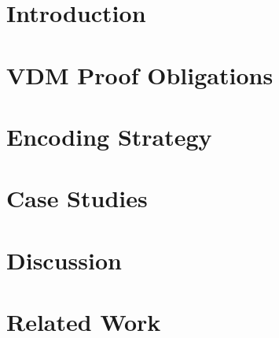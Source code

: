 \documentclass[sigconf]{acmart}
\begin{document}


\maketitle

% 
\section{Introduction}
\label{section:introduction}




% 

\section{VDM Proof Obligations}

% 

\label{section:proof-obligations}



\section{Encoding Strategy}
\label{section:encode-strategy}



\section{Case Studies}
\label{section:case-studies}



\section{Discussion}
\label{section:discussion}



\section{Related Work}
\label{section:related-work}




% 


\newcommand{\showDOI}[1]{\unskip}

\end{document}
